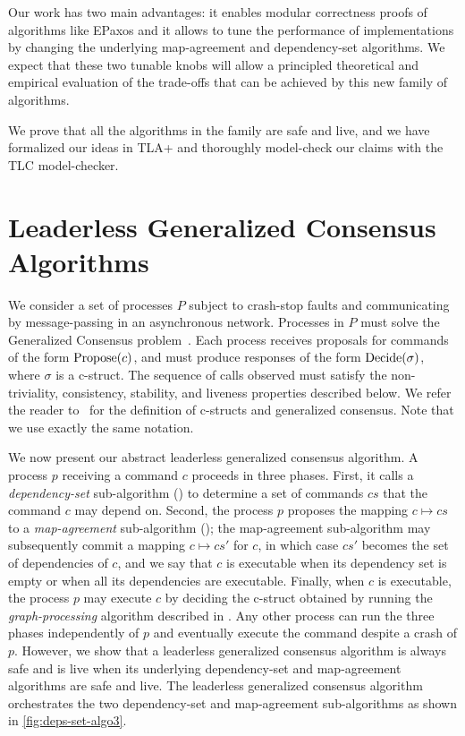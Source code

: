 Our work has two main advantages: it enables modular correctness proofs of algorithms like EPaxos and it allows to tune the performance of implementations by changing the underlying map-agreement and dependency-set algorithms. We expect that these two tunable knobs will allow a principled theoretical and empirical evaluation of the trade-offs that can be achieved by this new family of algorithms.

We prove that all the algorithms in the family are safe and live, and we have formalized our ideas in TLA+ and thoroughly model-check our claims with the TLC model-checker.

\section{Leaderless Generalized Consensus Algorithms}

We consider a set of processes $P$ subject to crash-stop faults and communicating by message-passing in an asynchronous network. Processes in $P$ must solve the Generalized Consensus problem~\cite{Lamport05GeneralizeConsensus}. Each process receives proposals for commands of the form $\operatorname{Propose}(c)$, and must produce responses of the form $\operatorname{Decide}(\sigma)$, where $\sigma$ is a c-struct. 
The sequence of calls observed must satisfy the non-triviality, consistency, stability, and liveness properties described below.
We refer the reader to~\cite{Lamport05GeneralizeConsensus} for the definition of c-structs and generalized consensus. Note that we use exactly the same notation.


We now present our abstract leaderless generalized consensus algorithm.
A process $p$ receiving a command $c$ proceeds in three phases. First, it calls a \textit{dependency-set} sub-algorithm () to determine a set of commands $cs$  that the command $c$ may depend on. Second, the process $p$ proposes the mapping  $c\mapsto cs$ to a \textit{map-agreement} sub-algorithm (); the map-agreement sub-algorithm may subsequently commit a mapping $c\mapsto cs'$ for $c$, in which case $cs'$ becomes the set of dependencies of $c$, and we say that $c$ is executable when its dependency set is empty or when all its dependencies are executable. 
Finally, when $c$ is executable, the process $p$ may execute $c$ by deciding the c-struct obtained by running the \emph{graph-processing} algorithm described in .
Any other process can run the three phases independently of $p$ and eventually execute the command despite a crash of $p$.
However, we show that a leaderless  generalized consensus algorithm is always safe and is live when its underlying dependency-set and map-agreement algorithms are safe and live.
The leaderless generalized consensus algorithm orchestrates the two dependency-set and map-agreement sub-algorithms as shown in \cref{fig:deps-set-algo3}.


